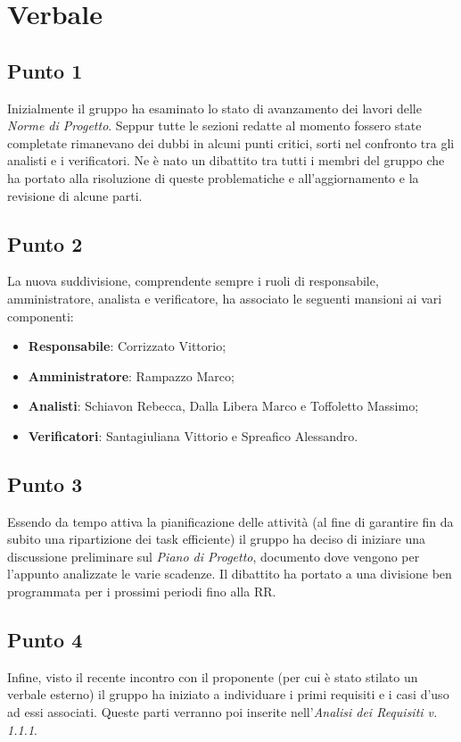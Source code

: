 \section{Verbale}
    \subsection{Punto 1}
        Inizialmente il gruppo ha esaminato lo stato di avanzamento dei lavori delle \textit{Norme di Progetto}. Seppur tutte le sezioni redatte al momento fossero state completate rimanevano dei dubbi in alcuni punti critici, sorti nel confronto tra gli analisti e i verificatori. Ne è nato un dibattito tra tutti i membri del gruppo che ha portato alla risoluzione di queste problematiche e all'aggiornamento e la revisione di alcune parti. 
    \subsection{Punto 2}
        La nuova suddivisione, comprendente sempre i ruoli di responsabile, amministratore, analista e verificatore, ha associato le seguenti mansioni ai vari componenti:
        \begin{itemize}
            \item \textbf{Responsabile}: Corrizzato Vittorio;
            \item \textbf{Amministratore}: Rampazzo Marco;
            \item \textbf{Analisti}: Schiavon Rebecca, Dalla Libera Marco e Toffoletto Massimo;
            \item \textbf{Verificatori}: Santagiuliana Vittorio e Spreafico Alessandro.
        \end{itemize}
    \subsection{Punto 3}
        Essendo da tempo attiva la pianificazione delle attività (al fine di garantire fin da subito una ripartizione dei task efficiente) il gruppo ha deciso di iniziare una discussione preliminare sul \textit{Piano di Progetto}, documento dove vengono per l'appunto analizzate le varie scadenze. Il dibattito ha portato a una divisione ben programmata per i prossimi periodi fino alla RR.
    \subsection{Punto 4}
        Infine, visto il recente incontro con il proponente (per cui è stato stilato un verbale esterno) il gruppo ha iniziato a individuare i primi requisiti e i casi d'uso ad essi associati. Queste parti verranno poi inserite nell'\textit{Analisi dei Requisiti v. 1.1.1}.